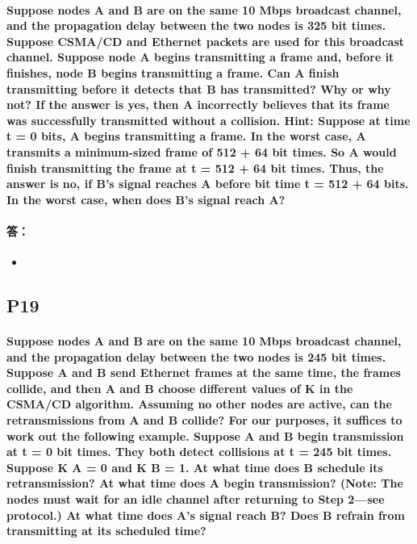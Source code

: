 \documentclass[a4paper]{ctexart}
\begin{document}
\paragraph*{Suppose nodes A and B are on the same 10 Mbps broadcast channel, and the propagation delay between the two nodes is 325 bit times. Suppose CSMA/CD and Ethernet packets are used for this broadcast channel. Suppose node A begins transmitting a frame and, before it finishes, node B begins transmitting a frame. Can A finish transmitting before it detects that B has transmitted? Why or why not? If the answer is yes, then A incorrectly believes that its frame was successfully transmitted without a collision. Hint: Suppose at time t = 0 bits, A begins transmitting a frame. In the worst case, A transmits a minimum-sized frame of 512 + 64 bit times. So A would finish transmitting the frame at t = 512 + 64 bit times. Thus, the answer is no, if B’s signal reaches A before bit time t = 512 + 64 bits. In the worst case, when does B’s signal reach A?\\}
\paragraph*{答：} 
\begin{itemize}
    \item 
\end{itemize}

\subsection*{P19}
\paragraph*{Suppose nodes A and B are on the same 10 Mbps broadcast channel, and the propagation delay between the two nodes is 245 bit times. Suppose A and B send Ethernet frames at the same time, the frames collide, and then A and B choose different values of K in the CSMA/CD algorithm. Assuming no other nodes are active, can the retransmissions from A and B collide? For our purposes, it suffices to work out the following example. Suppose A and B begin transmission at t = 0 bit times. They both detect collisions at t = 245 bit times. Suppose K A = 0 and K B = 1. At what time does B schedule its retransmission? At what time does A begin transmission? (Note: The nodes must wait for an idle channel after returning to Step 2—see protocol.) At what time does A’s signal reach B? Does B refrain from transmitting at its scheduled time?\\}
\end{document}
